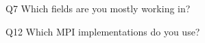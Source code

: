 \begin{description}%
\item{Q7} Which fields are you mostly working in?%
\item{Q12} Which MPI implementations do you use?%
\end{description}%
